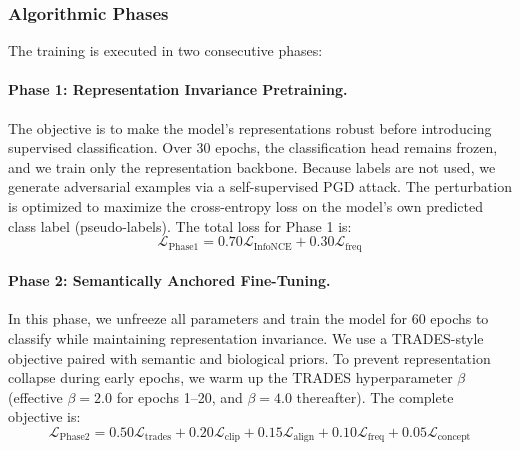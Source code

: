 \documentclass[12pt,a4paper]{article}
\begin{document}
\subsubsection{Algorithmic Phases}
The training is executed in two consecutive phases:

\paragraph{Phase 1: Representation Invariance Pretraining.} The objective is to make the model's representations robust before introducing supervised classification. Over 30 epochs, the classification head remains frozen, and we train only the representation backbone. Because labels are not used, we generate adversarial examples via a self-supervised PGD attack. The perturbation is optimized to maximize the cross-entropy loss on the model's own predicted class label (pseudo-labels). The total loss for Phase 1 is:
\begin{equation}
\mathcal{L}_{\text{Phase1}} = 0.70 \mathcal{L}_{\text{InfoNCE}} + 0.30 \mathcal{L}_{\text{freq}}
\label{eq:phase1}
\end{equation}

\paragraph{Phase 2: Semantically Anchored Fine-Tuning.} In this phase, we unfreeze all parameters and train the model for 60 epochs to classify while maintaining representation invariance. We use a TRADES-style objective paired with semantic and biological priors. To prevent representation collapse during early epochs, we warm up the TRADES hyperparameter $\beta$ (effective $\beta=2.0$ for epochs 1--20, and $\beta=4.0$ thereafter). The complete objective is:
\begin{equation}
\mathcal{L}_{\text{Phase2}} = 0.50 \mathcal{L}_{\text{trades}} + 0.20 \mathcal{L}_{\text{clip}} + 0.15 \mathcal{L}_{\text{align}} + 0.10 \mathcal{L}_{\text{freq}} + 0.05 \mathcal{L}_{\text{concept}}
\label{eq:phase2}
\end{equation}
\end{document}

